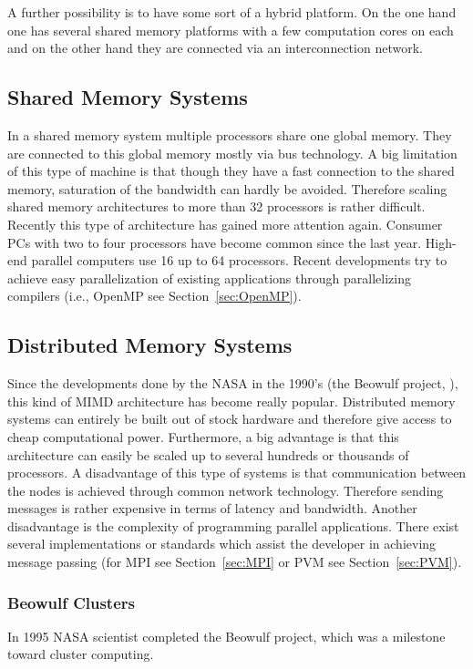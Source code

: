 A further possibility is to have some sort of a hybrid platform. On
the one hand one has several shared memory platforms with a few
computation cores on each and on the other hand they are connected via
an interconnection network. 

\subsection{Shared Memory Systems}
\label{sec:sharedmemorysystems}
In a shared memory system multiple processors share one global
memory. They are connected to this global memory mostly via bus
technology. A big limitation of this type of machine is that though they have
a fast connection to the shared memory, saturation of the bandwidth can
hardly be avoided. Therefore scaling shared memory architectures to
more than 32 processors is rather difficult. Recently this type of
architecture has gained more attention again. Consumer PCs with two to four
processors have become common since the last year. High-end parallel
computers use 16 up to 64 processors. Recent developments try to
achieve easy parallelization of existing applications through
parallelizing compilers (i.e., OpenMP see Section~\ref{sec:OpenMP}).

\subsection{Distributed Memory Systems}
\label{sec:distributedmemorysystems}
Since the developments done by the NASA in the 1990's (the Beowulf
project, \cite{becker95bpw}),
this kind of MIMD architecture has become really popular.
Distributed memory systems can
entirely be built out of stock hardware and therefore give access to
cheap computational power. Furthermore, a big advantage is that this
architecture can easily be scaled up to several hundreds or thousands
of processors. A disadvantage of this type of systems is that
communication between the nodes is achieved through common network
technology. Therefore sending messages is rather expensive in terms of
latency and bandwidth. Another disadvantage is the complexity of
programming parallel applications. There exist several implementations
or standards which assist the developer in achieving message passing
(for MPI see Section~\ref{sec:MPI} or PVM see Section~\ref{sec:PVM}).

\subsubsection{Beowulf Clusters}
In 1995 NASA scientist completed the Beowulf project, which was a
milestone toward cluster computing.

